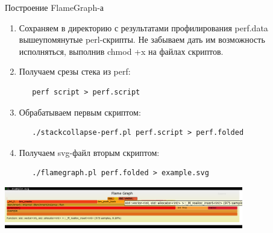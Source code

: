 \begin{frame}[fragile]{Построение FlameGraph-а}
	\begin{enumerate}
		\item Сохраняем в директорию с результатами профилирования perf.data вышеупомянутые perl-скрипты. Не забываем дать им возможность исполняться, выполнив chmod +x на файлах скриптов.
		\item Получаем срезы стека из perf:
\scriptsize\begin{lstlisting}
   perf script > perf.script 
\end{lstlisting}\normalsize
		\item Обрабатываем первым скриптом:
\scriptsize\begin{lstlisting}
   ./stackcollapse-perf.pl perf.script > perf.folded
\end{lstlisting}\normalsize
		\item Получаем svg-файл вторым скриптом:
\scriptsize\begin{lstlisting}
   ./flamegraph.pl perf.folded > example.svg
\end{lstlisting}\normalsize
	\end{enumerate}
	\vspace{-0.5cm}
	\begin{center}
			\includegraphics[height=1.8cm]{img/flamegraph.png}
	\end{center}
\end{frame}

